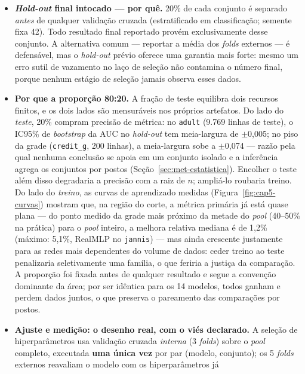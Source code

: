 \begin{itemize}
  \item \textbf{\emph{Hold-out} final intocado --- por quê.} 20\% de cada
    conjunto é separado \emph{antes} de qualquer validação cruzada
    (estratificado em classificação; semente fixa 42). Todo resultado final
    reportado provém exclusivamente desse conjunto. A alternativa comum ---
    reportar a média dos \emph{folds} externos --- é defensável, mas o
    \emph{hold-out} prévio oferece uma garantia mais forte: mesmo um erro
    sutil de vazamento no laço de seleção não contamina o número final,
    porque nenhum estágio de seleção jamais observa esses dados.
  \item \textbf{Por que a proporção 80:20.} A fração de teste equilibra
    dois recursos finitos, e os dois lados são mensuráveis nos próprios
    artefatos. Do lado do \emph{teste}, 20\% compram precisão de métrica:
    no \texttt{adult} (9.769 linhas de teste), o IC95\% de
    \emph{bootstrap} da AUC no \emph{hold-out} tem meia-largura de
    $\pm$0{,}005; no piso da grade (\texttt{credit\_g}, 200 linhas), a
    meia-largura sobe a $\pm$0{,}074 --- razão pela qual nenhuma conclusão
    se apoia em um conjunto isolado e a inferência agrega os conjuntos por
    postos (Seção~\ref{sec:met-estatistica}). Encolher o teste além disso
    degradaria a precisão com a raiz de $n$; ampliá-lo roubaria treino.
    Do lado do \emph{treino}, as curvas de aprendizado medidas
    (Figura~\ref{fig:cap5-curvas}) mostram que, na região do corte, a
    métrica primária já está quase plana --- do ponto medido da grade
    mais próximo da metade do \emph{pool} (40--50\% na prática) para o
    \emph{pool} inteiro, a melhora relativa mediana é de 1{,}2\%
    (máximo: 5{,}1\%, RealMLP no \texttt{jannis}) --- mas ainda crescente
    justamente para as redes mais dependentes do volume de dados: ceder treino ao teste
    penalizaria seletivamente uma família, o que feriria a justiça da
    comparação. A proporção foi fixada antes de qualquer resultado e
    segue a convenção dominante da área; por ser idêntica para os 14
    modelos, todos ganham e perdem dados juntos, o que preserva o
    pareamento das comparações por postos.
  \item \textbf{Ajuste e medição: o desenho real, com o viés
    declarado.} A seleção de hiperparâmetros usa validação cruzada
    \emph{interna} (3 \emph{folds}) sobre o \emph{pool} completo,
    executada \textbf{uma única vez} por par (modelo, conjunto); os 5
    \emph{folds} externos reavaliam o modelo com os hiperparâmetros já

\end{itemize}
